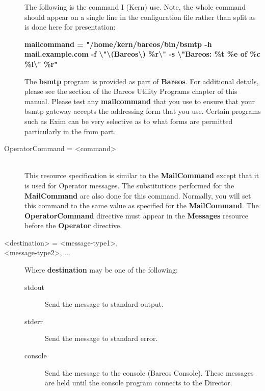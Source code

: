 \begin{description}
The following is the command I (Kern) use. Note, the whole  command should
appear on a single line in the configuration file  rather than split as is
done here for presentation:

{\bf mailcommand = "/home/kern/bareos/bin/bsmtp -h mail.example.com -f
\textbackslash{}"\textbackslash{}(Bareos\textbackslash{})
\%r\textbackslash{}" -s \textbackslash{}"Bareos: \%t \%e of \%c
\%l\textbackslash{}" \%r"}

The {\bf bsmtp} program is provided as part of {\bf Bareos}.  For
additional details, please see the
 section of
the  Bareos Utility Programs chapter of this manual. Please test any  {\bf
mailcommand} that you use to ensure that your bsmtp gateway accepts  the
addressing form that you use. Certain programs such as Exim can be very
selective as to what forms are permitted particularly in the from part.

\item [OperatorCommand = {\textless}command{\textgreater}] \hfill \\
This resource specification is  similar to the {\bf MailCommand} except that
it is used for Operator  messages. The substitutions performed for the {\bf
MailCommand} are  also done for this command. Normally, you will set this
command to the  same value as specified for the {\bf MailCommand}.
The {\bf OperatorCommand} directive must appear in the {\bf Messages}
resource before the {\bf Operator} directive.

\item [{\textless}destination{\textgreater} = {\textless}message-type1{\textgreater}, \hfill \\
{\textless}message-type2{\textgreater}, ...]

Where {\bf destination} may be one of the following:

\begin{description}

\item [stdout]
Send the message to standard output.

\item [stderr]
Send the message to standard error.

\item [console]
Send the message to the console (Bareos Console).  These messages are held
until the console program  connects to the Director.
\end{description}


\end{description}
